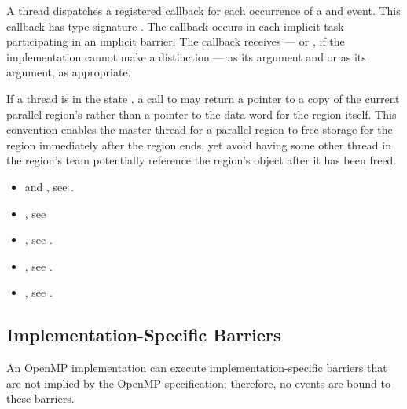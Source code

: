 A thread dispatches a registered
 callback for each occurrence
of a  and
 event.  This callback has type
signature .  The callback occurs
in each implicit task participating in an implicit barrier.  The
callback receives  --- or
, if the implementation cannot make a
distinction --- as its 
argument and  or  as
its  argument, as appropriate.

\restrictions
If a thread is in the state ,
a call to 
may return a pointer to a copy of the current parallel region's 
rather than a pointer to the data word for the region itself. This convention enables the master thread
for a parallel region to free storage for the region immediately after the region ends, yet
avoid having some other thread in the region's team
potentially reference the region's  object after it has been freed.

\crossreferences
\begin{itemize}

\item {} and , see
  .

\item {}, see

\item {}, see
  .

\item {}, see
  .

\item {}, see
  .

\end{itemize}


\subsection{Implementation-Specific Barriers}
\label{subsec:implementation-specific-barrier}

An OpenMP implementation can execute implementation-specific barriers
that are not implied by the OpenMP specification; therefore, no events
are bound to these barriers.

